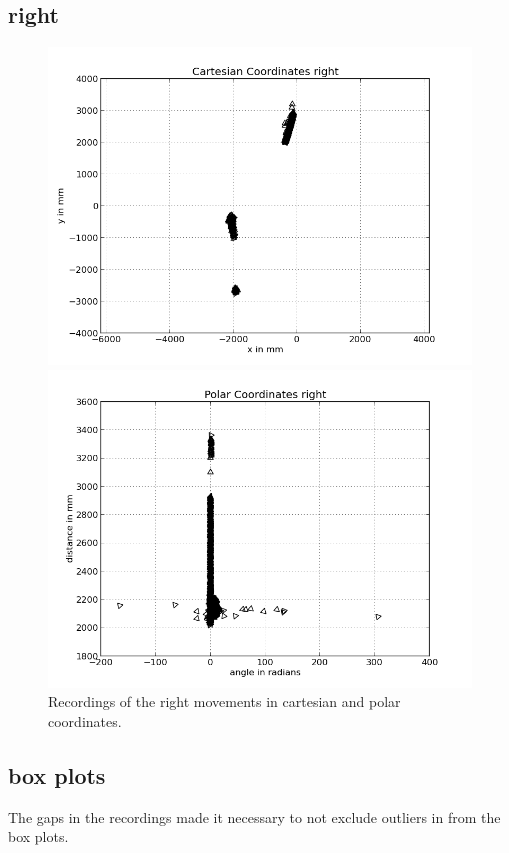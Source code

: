 \documentclass{scrartcl}
\begin{document}
\subsection{right}
\begin{figure}[H]
\centering
\begin{minipage}{.5\textwidth}
  \centering
  \includegraphics[width=.8\linewidth]{img/right.png}
\end{minipage}%
\begin{minipage}{.5\textwidth}
  \centering
  \includegraphics[width=.8\linewidth]{img/right_pc.png}
\end{minipage}
\caption{Recordings of the right movements in cartesian and polar coordinates.}
\label{fig:right}
\end{figure}

\subsection{box plots}
The gaps in the recordings made it necessary to not exclude outliers in from the box plots.
\end{document}
